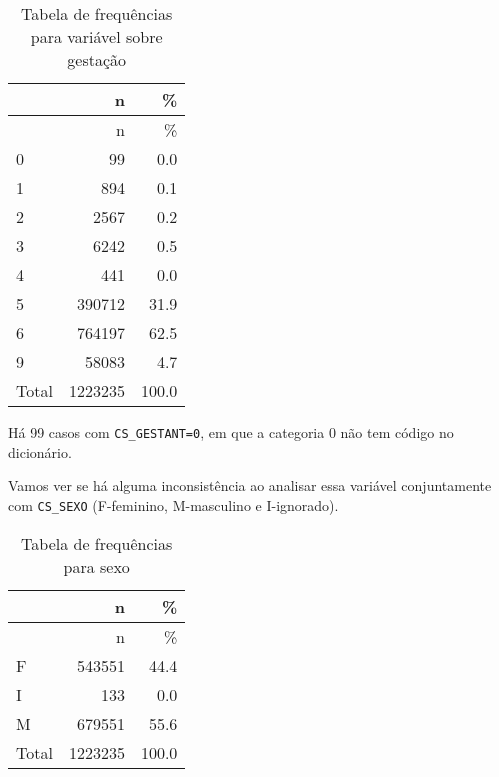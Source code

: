 \documentclass[
]{article}
\newenvironment{Shaded}{\begin{snugshade}}{\end{snugshade}}
\newcommand{\AttributeTok}[1]{\textcolor[rgb]{0.77,0.63,0.00}{#1}}
\newcommand{\CommentTok}[1]{\textcolor[rgb]{0.56,0.35,0.01}{\textit{#1}}}
\newcommand{\ConstantTok}[1]{\textcolor[rgb]{0.00,0.00,0.00}{#1}}
\newcommand{\DecValTok}[1]{\textcolor[rgb]{0.00,0.00,0.81}{#1}}
\newcommand{\FunctionTok}[1]{\textcolor[rgb]{0.00,0.00,0.00}{#1}}
\newcommand{\NormalTok}[1]{#1}
\newcommand{\SpecialCharTok}[1]{\textcolor[rgb]{0.00,0.00,0.00}{#1}}
\newcommand{\StringTok}[1]{\textcolor[rgb]{0.31,0.60,0.02}{#1}}
\begin{document}
\begin{longtable}[]{@{}lrr@{}}
\caption{Tabela de frequências para variável sobre
gestação}\tabularnewline
\toprule
& n & \% \\
\midrule
\endfirsthead
\toprule
& n & \% \\
\midrule
\endhead
0 & 99 & 0.0 \\
1 & 894 & 0.1 \\
2 & 2567 & 0.2 \\
3 & 6242 & 0.5 \\
4 & 441 & 0.0 \\
5 & 390712 & 31.9 \\
6 & 764197 & 62.5 \\
9 & 58083 & 4.7 \\
Total & 1223235 & 100.0 \\
\bottomrule
\end{longtable}

Há 99 casos com \texttt{CS\_GESTANT=0}, em que a categoria 0 não tem
código no dicionário.

Vamos ver se há alguma inconsistência ao analisar essa variável
conjuntamente com \texttt{CS\_SEXO} (F-feminino, M-masculino e
I-ignorado).

\begin{Shaded}
\end{Shaded}

\begin{longtable}[]{@{}lrr@{}}
\caption{Tabela de frequências para sexo}\tabularnewline
\toprule
& n & \% \\
\midrule
\endfirsthead
\toprule
& n & \% \\
\midrule
\endhead
F & 543551 & 44.4 \\
I & 133 & 0.0 \\
M & 679551 & 55.6 \\
Total & 1223235 & 100.0 \\
\bottomrule
\end{longtable}
\end{document}
